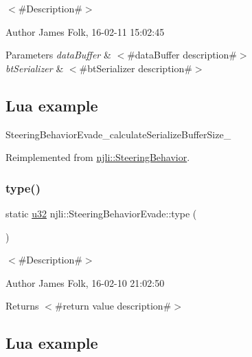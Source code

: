 $<$\#\+Description\#$>$ 

\begin{DoxyAuthor}{Author}
James Folk, 16-\/02-\/11 15\+:02\+:45
\end{DoxyAuthor}

\begin{DoxyParams}{Parameters}
{\em data\+Buffer} & $<$\#data\+Buffer description\#$>$ \\
\hline
{\em bt\+Serializer} & $<$\#bt\+Serializer description\#$>$\\
\hline
\end{DoxyParams}
\hypertarget{classnjli_1_1_steering_behavior_wander_ex1}{}\subsection{Lua example}\label{classnjli_1_1_steering_behavior_wander_ex1}

\begin{DoxyCodeInclude}
\end{DoxyCodeInclude}
Steering\+Behavior\+Evade\+\_\+calculate\+Serialize\+Buffer\+Size\+\_\+ 

Reimplemented from \mbox{\hyperlink{classnjli_1_1_steering_behavior_aa8494cb4a327c0040f64cfe8b393786e}{njli\+::\+Steering\+Behavior}}.

\mbox{\label{classnjli_1_1_steering_behavior_evade_ae3512120b3fa30c75371f54e1a450ebf}} 
\subsubsection{\texorpdfstring{type()}{type()}}
{\footnotesize\ttfamily static \mbox{\hyperlink{_util_8h_a10e94b422ef0c20dcdec20d31a1f5049}{u32}} njli\+::\+Steering\+Behavior\+Evade\+::type (\begin{DoxyParamCaption}{ }\end{DoxyParamCaption})\hspace{0.3cm}{\ttfamily [static]}}



$<$\#\+Description\#$>$ 

\begin{DoxyAuthor}{Author}
James Folk, 16-\/02-\/10 21\+:02\+:50
\end{DoxyAuthor}
\begin{DoxyReturn}{Returns}
$<$\#return value description\#$>$
\end{DoxyReturn}
\hypertarget{classnjli_1_1_steering_behavior_wander_ex1}{}\subsection{Lua example}\label{classnjli_1_1_steering_behavior_wander_ex1}

